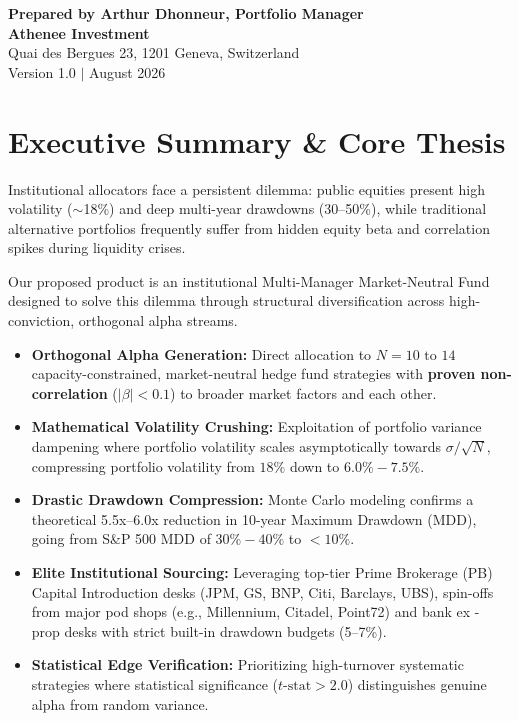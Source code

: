 \documentclass[11pt,a4paper]{article}
\begin{document}
\begin{titlepage}
    \vfill
    
    \begin{minipage}{0.9\textwidth}
        \centering\small
        \textbf{Prepared by Arthur Dhonneur, Portfolio Manager}\\
        \textbf{Athenee Investment}\\
        Quai des Bergues 23, 1201 Geneva, Switzerland\\[0.2cm]
        \textcolor{neutraldark}{Version 1.0 $\vert$ August 2026}
    \end{minipage}
    \vspace*{1.0cm}
\end{titlepage}

\newpage
\tableofcontents
\newpage

\section{Executive Summary \& Core Thesis}

Institutional allocators face a persistent dilemma: public equities present high volatility ($\sim$18\%) and deep multi-year drawdowns (30--50\%), while traditional alternative portfolios frequently suffer from hidden equity beta and correlation spikes during liquidity crises.

Our proposed product is an institutional Multi-Manager Market-Neutral Fund designed to solve this dilemma through structural diversification across high-conviction, orthogonal alpha streams.

\begin{calloutbox}[title=Key Strategy Pillars]
\begin{itemize}[leftmargin=1.5em, itemsep=0.3em]
    \item \textbf{Orthogonal Alpha Generation:} Direct allocation to $N = 10 \text{ to } 14$ capacity-constrained, market-neutral hedge fund strategies with \textbf{proven non-correlation} ($|\beta| < 0.1$) to broader market factors and each other.
    \item \textbf{Mathematical Volatility Crushing:} Exploitation of portfolio variance dampening where portfolio volatility scales asymptotically towards \textbf{$\sigma / \sqrt{N}$}, compressing portfolio volatility from $18\%$ down to $6.0\% - 7.5\%$.
    \item \textbf{Drastic Drawdown Compression:} Monte Carlo modeling confirms a theoretical 5.5x--6.0x reduction in 10-year Maximum Drawdown (MDD), going from S\&P 500 MDD of $30\%-40\%$ to $<10\%$.
    \item \textbf{Elite Institutional Sourcing:} Leveraging top-tier Prime Brokerage (PB) Capital Introduction desks (JPM, GS, BNP, Citi, Barclays, UBS), spin-offs from major pod shops (e.g., Millennium, Citadel, Point72) and bank ex - prop desks with strict built-in drawdown budgets (5--7\%).
    \item \textbf{Statistical Edge Verification:} Prioritizing high-turnover systematic strategies where statistical significance ($t\text{-stat} > 2.0$) distinguishes genuine alpha from random variance.
\end{itemize}
\end{calloutbox}
\end{document}
